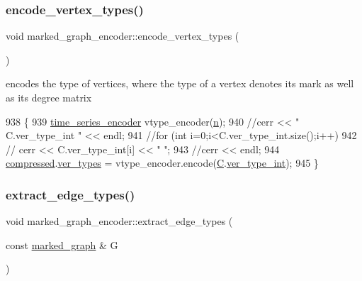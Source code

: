 \subsubsection{\texorpdfstring{encode\+\_\+vertex\+\_\+types()}{encode\_vertex\_types()}}
{\footnotesize\ttfamily void marked\+\_\+graph\+\_\+encoder\+::encode\+\_\+vertex\+\_\+types (\begin{DoxyParamCaption}{ }\end{DoxyParamCaption})\hspace{0.3cm}{\ttfamily [private]}}



encodes the type of vertices, where the type of a vertex denotes its mark as well as its degree matrix 


\begin{DoxyCode}
938 \{
939   \hyperlink{classtime__series__encoder}{time\_series\_encoder} vtype\_encoder(\hyperlink{classmarked__graph__encoder_a4c66d9fdbc14c97523715aac7e4511cb}{n});
940   \textcolor{comment}{//cerr << " C.ver\_type\_int " << endl;}
941   \textcolor{comment}{//for (int i=0;i<C.ver\_type\_int.size();i++)}
942   \textcolor{comment}{//  cerr << C.ver\_type\_int[i] << " ";}
943   \textcolor{comment}{//cerr << endl;}
944   \hyperlink{classmarked__graph__encoder_ac2ded200860fdd2321f86dd76b28bcb3}{compressed}.\hyperlink{classmarked__graph__compressed_af446cc5e23c241a92b76642fd5ebc403}{ver\_types} = vtype\_encoder.encode(\hyperlink{classmarked__graph__encoder_af82bc0653414091291cb75553a407bdb}{C}.\hyperlink{classcolored__graph_a491ed2ea1a65118af02ec606c8d44c0a}{ver\_type\_int});
945 \}
\end{DoxyCode}
\mbox{\label{classmarked__graph__encoder_ac3060e8f7e6abbe371c5968eb47cb8a1}} 
\subsubsection{\texorpdfstring{extract\+\_\+edge\+\_\+types()}{extract\_edge\_types()}}
{\footnotesize\ttfamily void marked\+\_\+graph\+\_\+encoder\+::extract\+\_\+edge\+\_\+types (\begin{DoxyParamCaption}\item[{const \hyperlink{classmarked__graph}{marked\+\_\+graph} \&}]{G }\end{DoxyParamCaption})\hspace{0.3cm}{\ttfamily [private]}}



